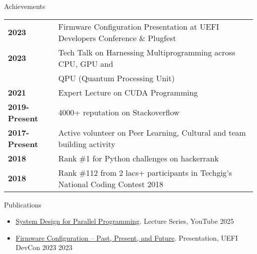 \documentclass{resume} %
\begin{document}
\begin{rSection}{Achievements}

\begin{tabular}{ @{} >{\bfseries}l @{\hspace{6ex}} l }
2023 & Firmware Configuration Presentation at UEFI Developers Conference \& Plugfest \\
2023 & Tech Talk on Harnessing Multiprogramming across CPU, GPU and 
\\ & QPU (Quantum Processing Unit) \\
2021 & Expert Lecture on CUDA Programming \\
2019-Present & 4000+ reputation on Stackoverflow \\
2017-Present & Active volunteer on Peer Learning, Cultural and team building activity \\
2018 & Rank \#1 for Python challenges on hackerrank \\
2018 & Rank \#112 from 2 lacs+ participants in Techgig's National Coding Contest 2018 \\

\end{tabular}

\end{rSection}

\begin{rSection}{Publications}

\begin{itemize}
    \item \href{https://www.youtube.com/playlist?list=PLWyBQeJgIuzD2o9ZVw5oI-P2fX4uyNKZA}{System Design for Parallel Programming}. Lecture Series, YouTube  \hfill {2025}
    \item \href{https://uefi.org/sites/default/files/resources/Firmware%20Configuration%20%E2%80%93%20Past%2C%20Present%2C%20and%20Future_Zimmer.pdf}{Firmware Configuration – Past, Present, and Future}. Presentation, UEFI DevCon 2023 \hfill {2023}
\end{itemize}


\end{rSection}
\end{document}
